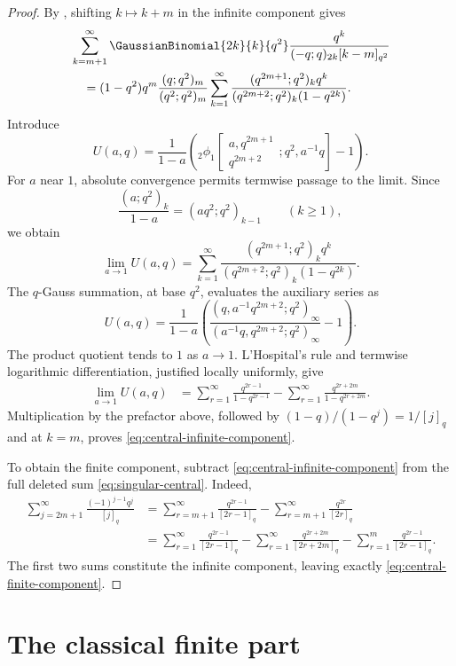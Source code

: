\documentclass[11pt,a4paper,oneside,openany]{book}
\theoremstyle{definition}
\theoremstyle{remark}
\begin{document}
\begin{proof}
By , shifting $k\mapsto k+m$ in the
infinite component gives
\begin{align*}
 &\sum_{k=m+1}^{\infty}
 \GaussianBinomial{2k}{k}{q^2}
 \frac{q^k}{(-q;q)_{2k}[k-m]_{q^2}}\\
 &\quad=(1-q^2)q^m\frac{(q;q^2)_m}{(q^2;q^2)_m}
 \sum_{k=1}^{\infty}
 \frac{(q^{2m+1};q^2)_kq^k}
 {(q^{2m+2};q^2)_k(1-q^{2k})}.
\end{align*}
Introduce
\[
 U(a,q)=\frac{1}{1-a}\left(
 {}_2\phi_1\!\left[
 \begin{matrix}a,q^{2m+1}\\q^{2m+2}\end{matrix};q^2,a^{-1}q
 \right]-1\right).
\]
For $a$ near $1$, absolute convergence permits termwise passage to the
limit.  Since
\[
 \frac{(a;q^2)_k}{1-a}=(aq^2;q^2)_{k-1}\qquad(k\ge1),
\]
we obtain
\[
 \lim_{a\to1}U(a,q)=
 \sum_{k=1}^{\infty}
 \frac{(q^{2m+1};q^2)_kq^k}
 {(q^{2m+2};q^2)_k(1-q^{2k})}.
\]
The $q$-Gauss summation, at base $q^2$, evaluates the auxiliary series as
\[
 U(a,q)=\frac{1}{1-a}\left(
 \frac{(q,a^{-1}q^{2m+2};q^2)_\infty}
 {(a^{-1}q,q^{2m+2};q^2)_\infty}-1\right).
\]
The product quotient tends to $1$ as $a\to1$.  L'Hospital's rule and
termwise logarithmic differentiation, justified locally uniformly, give
\begin{align*}
 \lim_{a\to1}U(a,q)
 &=\sum_{r=1}^{\infty}\frac{q^{2r-1}}{1-q^{2r-1}}
   -\sum_{r=1}^{\infty}\frac{q^{2r+2m}}{1-q^{2r+2m}}.
\end{align*}
Multiplication by the prefactor above, followed by
$(1-q)/(1-q^j)=1/[j]_q$ and  at $k=m$,
proves \eqref{eq:central-infinite-component}.

To obtain the finite component, subtract
\eqref{eq:central-infinite-component} from the full deleted sum
\eqref{eq:singular-central}.  Indeed,
\begin{align*}
 \sum_{j=2m+1}^{\infty}\frac{(-1)^{j-1}q^j}{[j]_q}
 &=\sum_{r=m+1}^{\infty}\frac{q^{2r-1}}{[2r-1]_q}
   -\sum_{r=m+1}^{\infty}\frac{q^{2r}}{[2r]_q}\\
 &=\sum_{r=1}^{\infty}\frac{q^{2r-1}}{[2r-1]_q}
   -\sum_{r=1}^{\infty}\frac{q^{2r+2m}}{[2r+2m]_q}
   -\sum_{r=1}^{m}\frac{q^{2r-1}}{[2r-1]_q}.
\end{align*}
The first two sums constitute the infinite component, leaving exactly
\eqref{eq:central-finite-component}.
\end{proof}

\section{The classical finite part}
\end{document}

